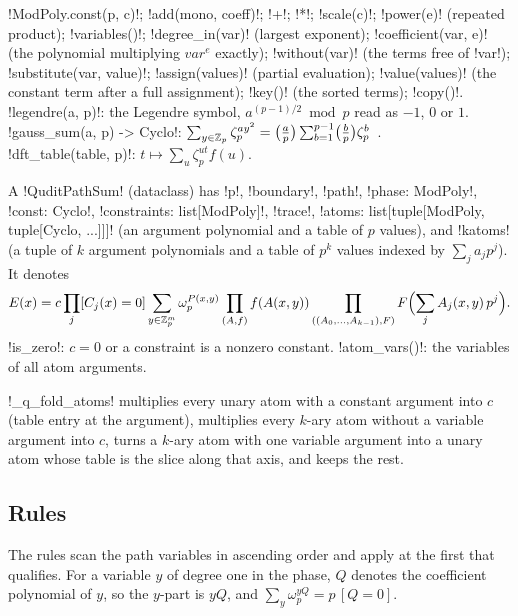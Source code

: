 \begin{signature}
\py!ModPoly.const(p, c)!; \py!add(mono, coeff)!; \py!+!; \py!*!; \py!scale(c)!; \py!power(e)! (repeated product); \py!variables()!; \py!degree_in(var)! (largest exponent); \py!coefficient(var, e)! (the polynomial multiplying $\mathit{var}^e$ exactly); \py!without(var)! (the terms free of \code!var!); \py!substitute(var, value)!; \py!assign(values)! (partial evaluation); \py!value(values)! (the constant term after a full assignment); \py!key()! (the sorted terms); \py!copy()!.\\
\py!legendre(a, p)!: the Legendre symbol, $a^{(p-1)/2}\bmod p$ read as $-1$, $0$ or $1$.\\
\py!gauss_sum(a, p) -> Cyclo!: $\sum_{y\in\mathbb{Z}_{p}}\zeta_p^{ay^2}=\bigl(\tfrac ap\bigr)\sum_{b=1}^{p-1}\bigl(\tfrac bp\bigr)\zeta_p^b$~\cite{berndt1998gauss}.\\
\py!dft_table(table, p)!: $t\mapsto\sum_u\zeta_p^{ut}f(u)$.
\end{signature}

\begin{definition}\label{def:algebra-qudit-pathsum}
A \py!QuditPathSum! (dataclass) has \py!p!, \py!boundary!, \py!path!, \py!phase: ModPoly!, \py!const: Cyclo!, \py!constraints: list[ModPoly]!, \py!trace!, \py!atoms: list[tuple[ModPoly, tuple[Cyclo, ...]]]! (an argument polynomial and a table of $p$ values), and \py!katoms! (a tuple of $k$ argument polynomials and a table of $p^k$ values indexed by $\sum_ja_jp^j$). It denotes
\begin{equation}
E(x)=c\prod_j[C_j(x)=0]\sum_{y\in\mathbb{Z}_{p}^{m}}\omega_p^{P(x,y)}\prod_{(A,f)}f(A(x,y))\prod_{((A_0,\ldots,A_{k-1}),F)}F\Bigl(\sum_jA_j(x,y)\,p^j\Bigr).
\end{equation}
\py!is_zero!: $c=0$ or a constraint is a nonzero constant. \py!atom_vars()!: the variables of all atom arguments.
\end{definition}

\py!_q_fold_atoms! multiplies every unary atom with a constant argument into $c$ (table entry at the argument), multiplies every $k$-ary atom without a variable argument into $c$, turns a $k$-ary atom with one variable argument into a unary atom whose table is the slice along that axis, and keeps the rest.

\subsection{Rules}

The rules scan the path variables in ascending order and apply at the first that qualifies. For a variable $y$ of degree one in the phase, $Q$ denotes the coefficient polynomial of $y$, so the $y$-part is $yQ$, and $\sum_{y}\omega_p^{yQ}=p\,[Q=0]$.

